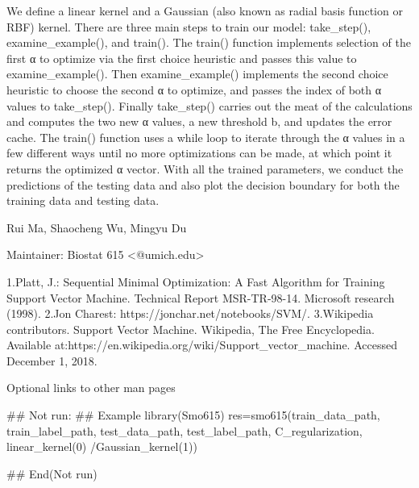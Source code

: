 \documentclass[a4paper]{book}
\begin{document}
%
\begin{Details}\relax
We define a linear kernel and a Gaussian (also known as radial basis function or RBF) kernel. There are three main steps to train our model: take\_step(), examine\_example(), and train(). The train() function implements selection of the first α to optimize via the first choice heuristic and passes this value to examine\_example(). Then examine\_example() implements the second choice heuristic to choose the second α
to optimize, and passes the index of both α values to take\_step(). Finally take\_step() carries out the meat of the calculations and computes the two new α values, a new threshold b, and updates the error cache. The train() function uses a while loop to iterate through the α values in a few different ways until no more optimizations can be made, at which point it returns the optimized α vector. With all the trained parameters, we conduct the predictions of the testing data and also plot the decision boundary for both the training data and testing data.
\end{Details}
%
\begin{Author}\relax
Rui Ma, Shaocheng Wu, Mingyu Du

Maintainer: Biostat 615 <@umich.edu>
\end{Author}
%
\begin{References}\relax
1.Platt, J.: Sequential Minimal Optimization: A Fast Algorithm for Training Support Vector Machine. Technical Report MSR-TR-98-14. Microsoft research (1998).
2.Jon Charest: https://jonchar.net/notebooks/SVM/.
3.Wikipedia contributors. Support Vector Machine. Wikipedia, The Free Encyclopedia. Available at:https://en.wikipedia.org/wiki/Support\_vector\_machine. Accessed December 1, 2018.
\end{References}
%
\begin{SeeAlso}\relax
Optional links to other man pages
\end{SeeAlso}
%
\begin{Examples}
\begin{ExampleCode}
  ## Not run: 
     ## Example
     library(Smo615)
     res=smo615(train_data_path, train_label_path, test_data_path, test_label_path, C_regularization, linear_kernel(0) /Gaussian_kernel(1))
  
## End(Not run)
\end{ExampleCode}
\end{Examples}
\printindex{}
\end{document}
